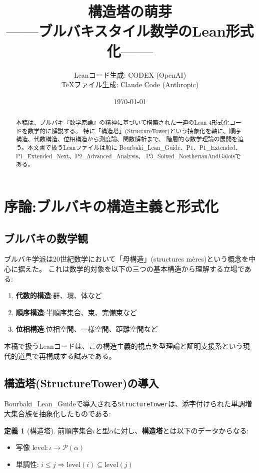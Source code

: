 \documentclass[a4paper,12pt]{ltjsarticle}
\title{構造塔の萌芽\\
——ブルバキスタイル数学のLean形式化——}
\author{Leanコード生成: CODEX (OpenAI)\\
TeXファイル生成: Claude Code (Anthropic)}
\date{\today}
\theoremstyle{definition}
\newtheorem{definition}[theorem]{定義}
\begin{document}
\maketitle

\begin{abstract}
本稿は、ブルバキ『数学原論』の精神に基づいて構築された一連のLean 4形式化コードを数学的に解説する。
特に「構造塔」(StructureTower)という抽象化を軸に、順序構造、代数構造、位相構造から測度論、関数解析まで、
階層的な数学理論の展開を追う。本文書で扱うLeanファイルは順に
Bourbaki\_Lean\_Guide、P1、P1\_Extended、P1\_Extended\_Next、P2\_Advanced\_Analysis、
P3\_Solved\_NoetherianAndGaloisである。
\end{abstract}

\tableofcontents
\clearpage

\section{序論:ブルバキの構造主義と形式化}

\subsection{ブルバキの数学観}
ブルバキ学派は20世紀数学において「母構造」(structures mères)という概念を中心に据えた。
これは数学的対象を以下の三つの基本構造から理解する立場である:
\begin{enumerate}
\item \textbf{代数的構造}:群、環、体など
\item \textbf{順序構造}:半順序集合、束、完備束など
\item \textbf{位相構造}:位相空間、一様空間、距離空間など
\end{enumerate}

本稿で扱うLeanコードは、この構造主義的視点を型理論と証明支援系という現代的道具で再構成する試みである。

\subsection{構造塔(StructureTower)の導入}
Bourbaki\_Lean\_Guideで導入される\texttt{StructureTower}は、添字付けられた単調増大集合族を抽象化したものである:

\begin{definition}[構造塔]\label{def:structure-tower}
前順序集合$\iota$と型$\alpha$に対し、\textbf{構造塔}とは以下のデータからなる:
\begin{itemize}
\item 写像 $\text{level}: \iota \to \mathcal{P}(\alpha)$
\item 単調性: $i \le j \Rightarrow \text{level}(i) \subseteq \text{level}(j)$
\end{itemize}
\end{definition}
\end{document}
